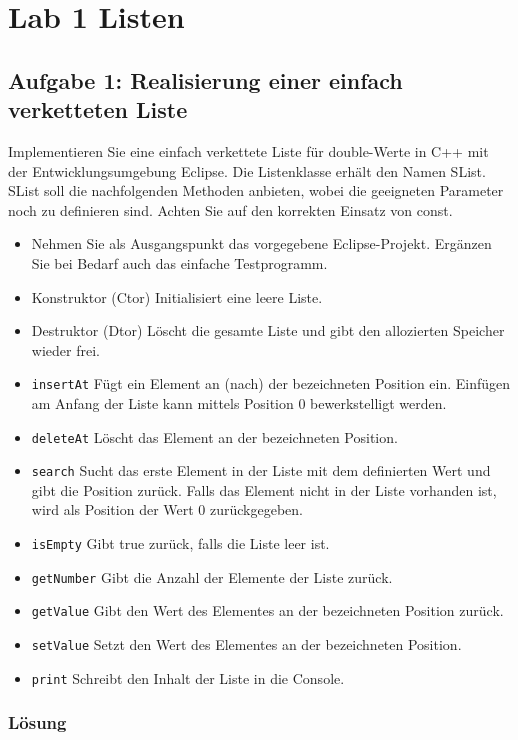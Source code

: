 \section{Lab 1 Listen}
\subsection{Aufgabe 1: Realisierung einer einfach verketteten Liste}
Implementieren Sie eine einfach verkettete Liste für double-Werte in C++ mit der Entwicklungsumgebung
Eclipse. Die Listenklasse erhält den Namen SList.
SList soll die nachfolgenden Methoden anbieten, wobei die geeigneten Parameter noch zu definieren sind.
Achten Sie auf den korrekten Einsatz von const.
\begin{itemize}
\item Nehmen Sie als Ausgangspunkt das vorgegebene Eclipse-Projekt. Ergänzen Sie bei Bedarf auch das einfache
Testprogramm.
\item Konstruktor (Ctor) Initialisiert eine leere Liste.
\item Destruktor (Dtor) Löscht die gesamte Liste und gibt den allozierten Speicher wieder frei.
\item \texttt{insertAt} Fügt ein Element an (nach) der bezeichneten Position ein. Einfügen am Anfang der Liste kann mittels Position 0 bewerkstelligt werden.
\item\texttt{deleteAt}
Löscht das Element an der bezeichneten Position.
\item\texttt{search}
Sucht das erste Element in der Liste mit dem definierten Wert und gibt die Position zurück. Falls das Element
nicht in der Liste vorhanden ist, wird als Position der Wert 0 zurückgegeben.
\item\texttt{isEmpty}
Gibt true zurück, falls die Liste leer ist.
\item\texttt{getNumber}
Gibt die Anzahl der Elemente der Liste zurück.
\item\texttt{getValue}
Gibt den Wert des Elementes an der bezeichneten Position zurück.
\item\texttt{setValue}
Setzt den Wert des Elementes an der bezeichneten Position.
\item\texttt{print}
Schreibt den Inhalt der Liste in die Console.
\end{itemize}

\subsubsection{Lösung}

